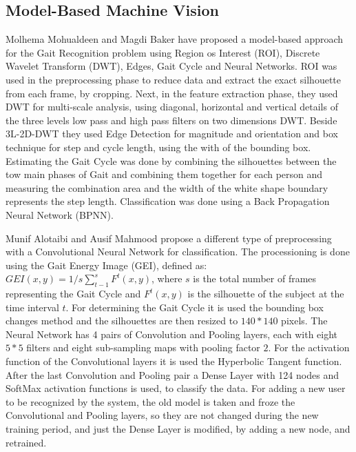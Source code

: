 \documentclass[12pt]{article}
\theoremstyle{definition}
\begin{document}
	\subsection{Model-Based Machine Vision}
	
	Molhema Mohualdeen and Magdi Baker \cite{gait-silhouette-nn} have proposed a model-based approach for the Gait Recognition problem using Region os Interest (ROI), Discrete Wavelet Transform (DWT), Edges, Gait Cycle and Neural Networks.
	ROI was used in the preprocessing phase to reduce data and extract the exact silhouette from each frame, by cropping. Next, in the feature extraction phase, they used DWT for multi-scale analysis, using diagonal, horizontal and vertical details of the three levels low pass and high pass filters on two dimensions DWT. Beside 3L-2D-DWT they used Edge Detection for magnitude and orientation and box technique for step and cycle length, using the with of the bounding box. Estimating the Gait Cycle was done by combining the silhouettes between the tow main phases of Gait and combining them together for each person and measuring the combination area and the width of the white shape boundary represents the step length. Classification was done using a Back Propagation Neural Network (BPNN).
	
	Munif Alotaibi and Ausif Mahmood \cite{gait-with-gei} propose a different type of preprocessing with a Convolutional Neural Network for classification. The processioning is done using the Gait Energy Image (GEI), defined as: $GEI(x, y)=1/s\sum_{t-1}^{s}F^t(x, y)$, where $s$ is the total number of frames representing the Gait Cycle and $F^t(x, y)$ is the silhouette of the subject at the time interval $t$. For determining the Gait Cycle it is used the bounding box changes method and the silhouettes are then resized to $140 * 140$ pixels. The Neural Network has 4 pairs of Convolution and Pooling layers, each with eight $5 * 5$ filters and eight sub-sampling maps with pooling factor $2$. For the activation function of the Convolutional layers it is used the Hyperbolic Tangent function. After the last Convolution and Pooling pair a Dense Layer with 124 nodes and SoftMax activation functions is used, to classify the data. For adding a new user to be recognized by the system, the old model is taken and froze the Convolutional and Pooling layers, so they are not changed during the new training period, and just the Dense Layer is modified, by adding a new node, and retrained.
	
\end{document}
